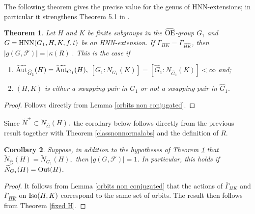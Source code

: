 \documentclass[a4paper,12pt]{article}
\newtheorem{thm}{Theorem}[section]
\newtheorem{cor}[thm]{Corollary}
\newcommand{\Oe}{\rm \widehat{OE}}
\def\aut {{\rm Aut}}
\def\out {{\rm Out}}
\def\hnn {{\rm HNN}}
\def\Iso {{\rm Iso}}
\begin{document}
{The following theorem gives the precise value for the genus of HNN-extensions; in particular it strengthens  Theorem 5.1 in \cite{BZ}.

\begin{thm} \label{nova conta non conjugadosss} Let $H$ and $K$ be finite subgroups in the $\Oe$-group $G_1$ and $G=\hnn(G_1,H,K,f,t)$ be an HNN-extension. If  $\overline\Gamma_{HK}=\overline\Gamma_{\widehat{HK}}$, then $|g(G, \mathcal{F})| = |\kappa(R)|.$ This is the case if \begin{enumerate}
    \item [i)]  $\widetilde{\aut}_{\widehat{G}_1}(H)=\widetilde{\aut}_{G_1}(H),$  $[G_1:N_{G_1}(K)]=[\widehat G_1:N_{\widehat G_1}(K)]<\infty$ and; 
    
    \item [ii)] $(H,K)$ is either a swapping pair in  $G_1$ or not a swapping pair in $\widehat G_1$. 
\end{enumerate} 
\end{thm}

\begin{proof} Follows directly from Lemma \ref{orbits non conjugated}. \end{proof}



Since $\widetilde{N}^{+} \subset \widetilde{N}_{\widehat G}(H),$ %
the corollary below follows directly from the previous result together with Theorem \ref{classnonnormalabs} and the definition of $R$.  
\begin{cor} \label{normal iguais genero 1 non conjugated} Suppose, in addition to the
hypotheses of Theorem \ref{nova conta non conjugadosss} that $\widetilde{N}_{\widehat G}(H)=\widetilde{N}_{G_1}(H),$
then $|g(G, \mathcal{F})|=1$. In particular, this holds if $\widetilde{N}_{G_1}(H)=\out(H)$.
\end{cor}

\begin{proof} It follows from Lemma \ref{orbits non conjugated} that the actions of $\overline{\Gamma}_{HK}$ and  $\overline{\Gamma}_{\widehat{HK}}$ on $\Iso(H, K)$ correspond to the same set of orbits. The result then follows from Theorem \ref{fixed H}.
\end{proof}

 

}
\end{document}
